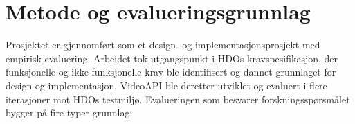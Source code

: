 \section{Metode og evalueringsgrunnlag}
Prosjektet er gjennomført som et design- og implementasjonsprosjekt med empirisk evaluering. Arbeidet tok utgangspunkt i HDOs kravspesifikasjon, der funksjonelle og ikke-funksjonelle krav ble identifisert og dannet grunnlaget for design og implementasjon. VideoAPI ble deretter utviklet og evaluert i flere iterasjoner mot HDOs testmiljø. Evalueringen som besvarer forskningsspørsmålet bygger på fire typer grunnlag:
    
    
    

